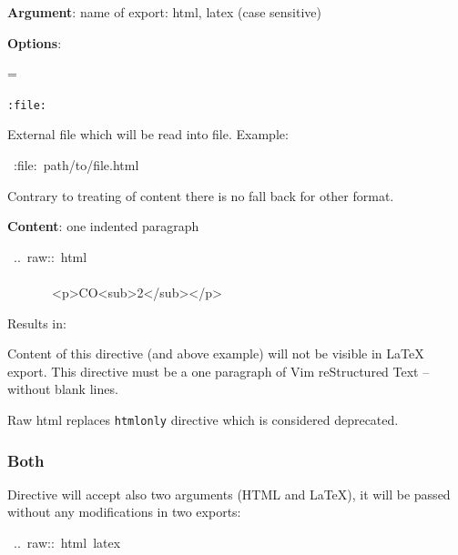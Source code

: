 \documentclass[12pt]{article}
\newenvironment{deflist}[1]{%
\begin{list}{}
{\renewcommand{\makelabel}[1]{\textbf{##1}\hfill}
\settowidth{\labelwidth}{\textbf{#1}}
\leftmargin=\labelwidth
\advance \leftmargin\labelsep}}
{\end{list}}
\begin{document}
\begin{itemize}
\item
\textbf{Argument}: name of export: html, latex (case sensitive)

\item
\textbf{Options}:

 \begin{deflist}{iii}

\item[ \texttt{:file:}]

External file which will be read into file. Example:

\begin{ttfamily}\begin{flushleft}
\mbox{~:file:~path/to/file.html}\\
\end{flushleft}\end{ttfamily}

 Contrary to treating of content there is no fall back for other
 format.
\end{deflist}

\item
\textbf{Content}: one indented paragraph
\end{itemize}

\begin{ttfamily}\begin{flushleft}
\mbox{~..~raw::~html}\\
\mbox{}\\
\mbox{~~~~~~~<p>CO<sub>2</sub></p>}\\
\end{flushleft}\end{ttfamily}

Results in:

Content of this directive (and above example) will not be visible in \LaTeX{}
export. This directive must be a one paragraph of Vim reStructured Text -- without blank lines.

Raw html replaces \texttt{htmlonly} directive which is considered deprecated.

\hypertarget{lboth}{}
\subsubsection{Both}

Directive will accept also two arguments (HTML and \LaTeX{}), it will be passed
without any modifications in two exports:

\begin{ttfamily}\begin{flushleft}
\mbox{~..~raw::~html~latex}\\
\end{flushleft}\end{ttfamily}
\end{document}
